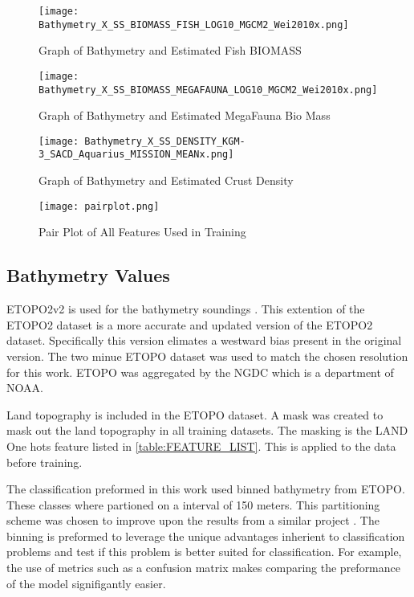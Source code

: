 \begin{figure}[h]
    \centering
    \texttt{[image: Bathymetry\_X\_SS\_BIOMASS\_FISH\_LOG10\_MGCM2\_Wei2010x.png]}
    \caption{Graph of Bathymetry and Estimated Fish BIOMASS}
    \label{fig:bathyxfish}
\end{figure}

\begin{figure}[h]
    \centering
    \texttt{[image: Bathymetry\_X\_SS\_BIOMASS\_MEGAFAUNA\_LOG10\_MGCM2\_Wei2010x.png]}
    \caption{Graph of Bathymetry and Estimated MegaFauna Bio Mass}
    \label{fig:bathyxfauna}
\end{figure}

\begin{figure}[h]
    \centering
    \texttt{[image: Bathymetry\_X\_SS\_DENSITY\_KGM-3\_SACD\_Aquarius\_MISSION\_MEANx.png]}
    \caption{Graph of Bathymetry and Estimated Crust Density}
    \label{fig:bathyxdensity}
\end{figure}

\begin{figure}[h]
    \centering
    \texttt{[image: pairplot.png]}
    \caption{Pair Plot of All Features Used in Training}
    \label{fig:pairplot}
\end{figure}


\subsection{Bathymetry Values}
ETOPO2v2 is used for the bathymetry soundings \cite{national20062}.
This extention of the ETOPO2 dataset \cite{national1988etopo} is a more accurate and updated version of the ETOPO2 dataset.
Specifically this version elimates a westward bias present in the original version.
The two minue \ac{ETOPO} dataset was used to match the chosen resolution for this work.
\ac{ETOPO} was aggregated by the \ac{NGDC} which is a department of \ac{NOAA}.

\par
Land topography is included in the \ac{ETOPO} dataset.
A mask was created to mask out the land topography in all training datasets.
The masking is the LAND One hots feature listed in \ref{table:FEATURE_LIST}.
This is applied to the data before training.

\par
The classification preformed in this work used binned bathymetry from \ac{ETOPO}.
These classes where partioned on a interval of 150 meters.
This partitioning scheme was chosen to improve upon the results from a similar project \cite{jena2012prediction}.
The binning is preformed to leverage the unique advantages inherient to classification problems and test if this problem is better suited for classification.
For example, the use of metrics such as a confusion matrix makes comparing the preformance of the model signifigantly easier.